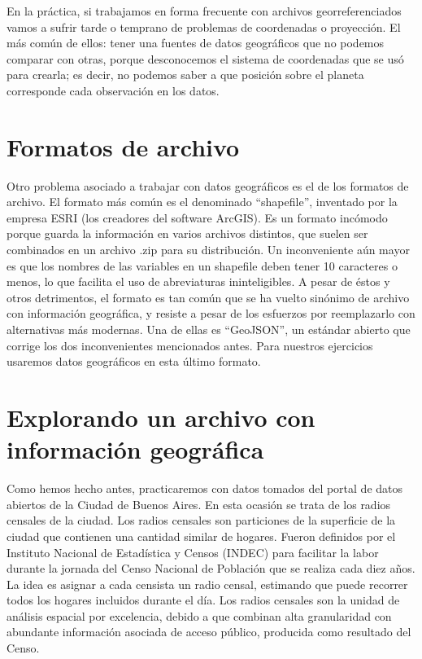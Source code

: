 \documentclass[]{book}
\begin{document}
En la práctica, si trabajamos en forma frecuente con archivos
georreferenciados vamos a sufrir tarde o temprano de problemas de
coordenadas o proyección. El más común de ellos: tener una fuentes de
datos geográficos que no podemos comparar con otras, porque desconocemos
el sistema de coordenadas que se usó para crearla; es decir, no podemos
saber a que posición sobre el planeta corresponde cada observación en
los datos.

\section{Formatos de archivo}\label{formatos-de-archivo}

Otro problema asociado a trabajar con datos geográficos es el de los
formatos de archivo. El formato más común es el denominado
``shapefile'', inventado por la empresa ESRI (los creadores del software
ArcGIS). Es un formato incómodo porque guarda la información en varios
archivos distintos, que suelen ser combinados en un archivo .zip para su
distribución. Un inconveniente aún mayor es que los nombres de las
variables en un shapefile deben tener 10 caracteres o menos, lo que
facilita el uso de abreviaturas ininteligibles. A pesar de éstos y otros
detrimentos, el formato es tan común que se ha vuelto sinónimo de
archivo con información geográfica, y resiste a pesar de los esfuerzos
por reemplazarlo con alternativas más modernas. Una de ellas es
``GeoJSON'', un estándar abierto que corrige los dos inconvenientes
mencionados antes. Para nuestros ejercicios usaremos datos geográficos
en esta último formato.

\section{Explorando un archivo con información
geográfica}\label{explorando-un-archivo-con-informacion-geografica}

Como hemos hecho antes, practicaremos con datos tomados del portal de
datos abiertos de la Ciudad de Buenos Aires. En esta ocasión se trata de
los radios censales de la ciudad. Los radios censales son particiones de
la superficie de la ciudad que contienen una cantidad similar de
hogares. Fueron definidos por el Instituto Nacional de Estadística y
Censos (INDEC) para facilitar la labor durante la jornada del Censo
Nacional de Población que se realiza cada diez años. La idea es asignar
a cada censista un radio censal, estimando que puede recorrer todos los
hogares incluidos durante el día. Los radios censales son la unidad de
análisis espacial por excelencia, debido a que combinan alta
granularidad con abundante información asociada de acceso público,
producida como resultado del Censo.
\end{document}
